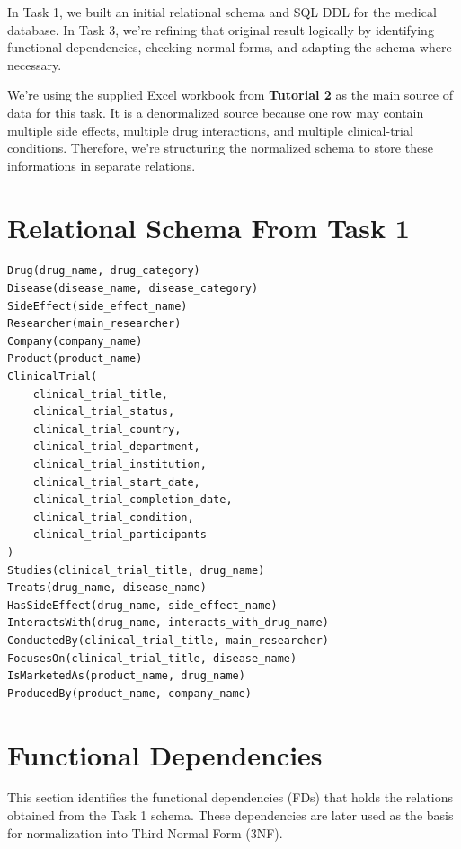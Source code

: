 \documentclass[12pt,a4paper]{article}
\begin{document}
In Task 1, we built an initial relational schema and SQL DDL for the medical database. 
In Task 3, we're refining that original result logically by identifying functional
dependencies, checking normal forms, and adapting the schema where necessary.

We're using the supplied Excel workbook from \textbf{Tutorial 2} as the main source of data for this task. 
It is a denormalized source because one row may contain multiple side effects, multiple drug interactions,
and multiple clinical-trial conditions. 
Therefore, we're structuring the normalized schema to store these informations in separate relations.

\section{Relational Schema From Task 1}

\begin{lstlisting}
Drug(drug_name, drug_category)
Disease(disease_name, disease_category)
SideEffect(side_effect_name)
Researcher(main_researcher)
Company(company_name)
Product(product_name)
ClinicalTrial(
    clinical_trial_title,
    clinical_trial_status,
    clinical_trial_country,
    clinical_trial_department,
    clinical_trial_institution,
    clinical_trial_start_date,
    clinical_trial_completion_date,
    clinical_trial_condition,
    clinical_trial_participants
)
Studies(clinical_trial_title, drug_name)
Treats(drug_name, disease_name)
HasSideEffect(drug_name, side_effect_name)
InteractsWith(drug_name, interacts_with_drug_name)
ConductedBy(clinical_trial_title, main_researcher)
FocusesOn(clinical_trial_title, disease_name)
IsMarketedAs(product_name, drug_name)
ProducedBy(product_name, company_name)
\end{lstlisting}

\section{Functional Dependencies}
This section identifies the functional dependencies (FDs) that holds the
relations obtained from the Task 1 schema. These dependencies are later used as the basis for
normalization into Third Normal Form (3NF).

\newpage
\end{document}
